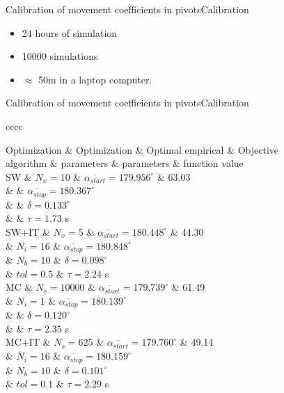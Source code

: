 \documentclass[10pt]{beamer}
\newcommand{\TABLE}[3]
{
	\begin{table}[ht!]
		\centering
		#1
		\tabulinesep=0.9mm
		\begin{tabu}{#2}
			#3
		\end{tabu}
	\end{table}
}
\begin{document}
\begin{frame}{Calibration of movement coefficients in pivots}{Calibration}
	\begin{itemize}
		\item 24 hours of simulation
		\item 10000 simulations
		\item $\approx$ 50m in a laptop computer.
	\end{itemize}
\end{frame}

\begin{frame}{Calibration of movement coefficients in pivots}{Calibration}
\TABLE{\tiny}{cccc}
{
	Optimization & Optimization & Optimal empirical & Objective
	\\ algorithm & parameters & parameters & function value
	\\ \hline
	SW & $N_x=10$ & $\overline{\alpha_{start}}=179.956^\circ$
	& 63.03
	\\ & & $\overline{\alpha_{stop}}=180.367^\circ$
	\\ & & $\delta=0.133^\circ$
	\\ & & $\tau=1.73$ s
	\\ \hline
	SW+IT & $N_x=5$ & $\overline{\alpha_{start}}=180.448^\circ$
	& 44.30
	\\ & $N_i=16$ & $\overline{\alpha_{stop}}=180.848^\circ$
	\\ & $N_b=10$ & $\delta=0.098^\circ$
	\\ & $tol=0.5$ & $\tau=2.24$ s
	\\ \hline
	MC & $N_s=10000$
	& $\overline{\alpha_{start}}=179.739^\circ$ & 61.49
	\\ & $N_i=1$ & $\overline{\alpha_{stop}}=180.139^\circ$
	\\ & & $\delta=0.120^\circ$
	\\ & & $\tau=2.35$ s
	\\ \hline
	MC+IT & $N_s=625$
	& $\overline{\alpha_{start}}=179.760^\circ$ & 49.14
	\\ & $N_i=16$ & $\overline{\alpha_{stop}}=180.159^\circ$
	\\ & $N_b=10$ & $\delta=0.101^\circ$
	\\ & $tol=0.1$ & $\tau=2.29$ s
	\\ \hline
}
\end{frame}
\end{document}
